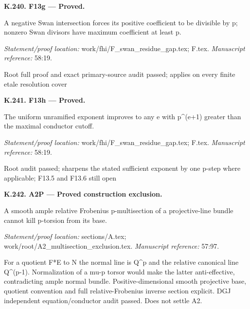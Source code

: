 \par\medskip\noindent\textbf{K.240. F13g --- Proved.}\par
A negative Swan intersection forces its positive coefficient to be divisible by p; nonzero Swan divisors have maximum coefficient at least p.
\par\emph{Statement/proof location:} work/fhi/F\_swan\_residue\_gap.tex; F.tex.
\emph{Manuscript reference:} 58:19.
\par Root full proof and exact primary-source audit passed; applies on every finite etale resolution cover
\par\medskip\noindent\textbf{K.241. F13h --- Proved.}\par
The uniform unramified exponent improves to any e with p\textasciicircum{}(e+1) greater than the maximal conductor cutoff.
\par\emph{Statement/proof location:} work/fhi/F\_swan\_residue\_gap.tex; F.tex.
\emph{Manuscript reference:} 58:19.
\par Root audit passed; sharpens the stated sufficient exponent by one p-step where applicable; F13.5 and F13.6 still open
\par\medskip\noindent\textbf{K.242. A2P --- Proved construction exclusion.}\par
A smooth ample relative Frobenius p-multisection of a projective-line bundle cannot kill p-torsion from its base.
\par\emph{Statement/proof location:} sections/A.tex; work/root/A2\_multisection\_exclusion.tex.
\emph{Manuscript reference:} 57:97.
\par For a quotient F*E to N the normal line is Q\textasciicircum{}p and the relative canonical line Q\textasciicircum{}(p-1). Normalization of a mu-p torsor would make the latter anti-effective, contradicting ample normal bundle. Positive-dimensional smooth projective base, quotient convention and full relative-Frobenius inverse section explicit. DGJ independent equation/conductor audit passed. Does not settle A2.
\endgroup
